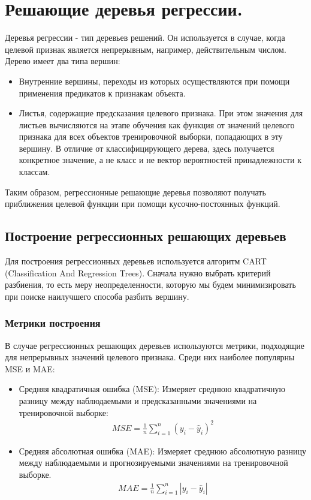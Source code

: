 \section{Решающие деревья регрессии.}

Деревья регрессии - тип деревьев решений. Он используется в случае, когда целевой признак является непрерывным, например, действительным числом. Дерево имеет два типа вершин:
\begin{itemize}
    \item Внутренние вершины, переходы из которых осуществляются при помощи применения предикатов к признакам объекта.
    \item Листья, содержащие предсказания целевого признака. При этом значения для листьев вычисляются на этапе обучения как функция от значений целевого признака для всех объектов тренировочной выборки, попадающих в эту вершину. В отличие от классифицирующего дерева, здесь получается конкретное значение, а не класс и не вектор вероятностей принадлежности к классам.
\end{itemize}
Таким образом, регрессионные решающие деревья позволяют получать приближения целевой функции при помощи кусочно-постоянных функций.

\subsection{Построение регрессионных решающих деревьев}
Для построения регрессионных деревьев используется алгоритм CART (Classification And Regression Trees). Сначала нужно выбрать критерий разбиения, то есть меру неопределенности, которую мы будем минимизировать при поиске наилучшего способа разбить вершину.

\subsubsection{Метрики построения}
В случае регрессионных решающих деревьев используются метрики, подходящие для непрерывных значений целевого признака. Среди них наиболее популярны MSE и MAE:
\begin{itemize}
    \item  Средняя квадратичная ошибка (MSE): Измеряет среднюю квадратичную разницу между наблюдаемыми и предсказанными значениями на тренировочной выборке:
    \begin{align*}
        MSE = \frac{1}{n} \sum_{i=1}^{n} (y_i - \hat{y}_i)^2
    \end{align*} 
    \item Средняя абсолютная ошибка (MAE): Измеряет среднюю абсолютную разницу между наблюдаемыми и прогнозируемыми значениями на тренировочной выборке.
    \begin{align*}
        MAE = \frac{1}{n} \sum_{i=1}^{n} |y_i - \hat{y}_i|
    \end{align*}
\end{itemize}

